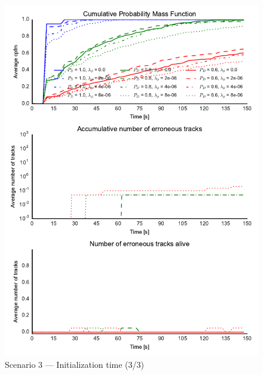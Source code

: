 \begin{figure}
\centering
\includegraphics{Figures/plots/Scenario3_Init-Time(3-3).pdf}
\caption{Scenario 3 --- Initialization time (3/3)}\label{fig:init3_time_3-3}
\end{figure}

